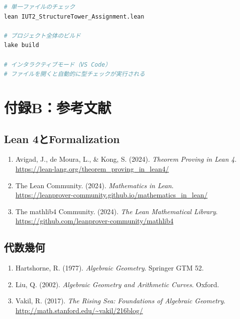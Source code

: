 \documentclass{ltjsarticle}
\begin{document}
\begin{lstlisting}[language=bash,caption=課題ファイルのビルド]
# 単一ファイルのチェック
lean IUT2_StructureTower_Assignment.lean

# プロジェクト全体のビルド
lake build

# インタラクティブモード（VS Code）
# ファイルを開くと自動的に型チェックが実行される
\end{lstlisting}

\section{付録B：参考文献}

\subsection{Lean 4とFormalization}

\begin{enumerate}
\item Avigad, J., de Moura, L., \& Kong, S. (2024). \textit{Theorem Proving in Lean 4}. \\
\url{https://lean-lang.org/theorem_proving_in_lean4/}

\item The Lean Community. (2024). \textit{Mathematics in Lean}. \\
\url{https://leanprover-community.github.io/mathematics_in_lean/}

\item The mathlib4 Community. (2024). \textit{The Lean Mathematical Library}. \\
\url{https://github.com/leanprover-community/mathlib4}
\end{enumerate}

\subsection{代数幾何}

\begin{enumerate}
\item Hartshorne, R. (1977). \textit{Algebraic Geometry}. Springer GTM 52.

\item Liu, Q. (2002). \textit{Algebraic Geometry and Arithmetic Curves}. Oxford.

\item Vakil, R. (2017). \textit{The Rising Sea: Foundations of Algebraic Geometry}. \\
\url{http://math.stanford.edu/~vakil/216blog/}
\end{enumerate}
\end{document}
